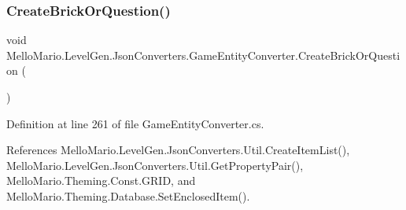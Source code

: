 \subsubsection{Create\+Brick\+Or\+Question()}
{\footnotesize\ttfamily void Mello\+Mario.\+Level\+Gen.\+Json\+Converters.\+Game\+Entity\+Converter.\+Create\+Brick\+Or\+Question (\begin{DoxyParamCaption}{ }\end{DoxyParamCaption})\hspace{0.3cm}{\ttfamily [private]}}



Definition at line 261 of file Game\+Entity\+Converter.\+cs.



References Mello\+Mario.\+Level\+Gen.\+Json\+Converters.\+Util.\+Create\+Item\+List(), Mello\+Mario.\+Level\+Gen.\+Json\+Converters.\+Util.\+Get\+Property\+Pair(), Mello\+Mario.\+Theming.\+Const.\+G\+R\+ID, and Mello\+Mario.\+Theming.\+Database.\+Set\+Enclosed\+Item().


